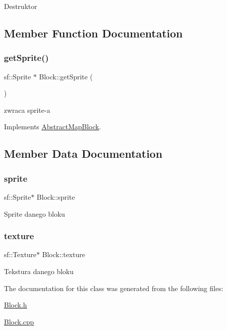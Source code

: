Destruktor 

\subsection{Member Function Documentation}
\mbox{\label{class_block_acd9b061af3ad9e79cf49bf9d4dc3d8b9}} 
\subsubsection{\texorpdfstring{get\+Sprite()}{getSprite()}}
{\footnotesize\ttfamily sf\+::\+Sprite $\ast$ Block\+::get\+Sprite (\begin{DoxyParamCaption}{ }\end{DoxyParamCaption})\hspace{0.3cm}{\ttfamily [virtual]}}

zwraca sprite-\/a 

Implements \hyperlink{class_abstract_map_block_ab5a448a1b6478d10a8814c6d19c4fdb4}{Abstract\+Map\+Block}.



\subsection{Member Data Documentation}
\mbox{\label{class_block_a5cf88ebac5cc92a309ec3e0d9c9d5fe8}} 
\subsubsection{\texorpdfstring{sprite}{sprite}}
{\footnotesize\ttfamily sf\+::\+Sprite$\ast$ Block\+::sprite\hspace{0.3cm}{\ttfamily [protected]}}

Sprite danego bloku \mbox{\label{class_block_a61ef2e4fef4ab4a950d3217f88cb8369}} 
\subsubsection{\texorpdfstring{texture}{texture}}
{\footnotesize\ttfamily sf\+::\+Texture$\ast$ Block\+::texture\hspace{0.3cm}{\ttfamily [protected]}}

Tekstura danego bloku 

The documentation for this class was generated from the following files\+:\begin{DoxyCompactItemize}
\item 
\hyperlink{_block_8h}{Block.\+h}\item 
\hyperlink{_block_8cpp}{Block.\+cpp}\end{DoxyCompactItemize}
